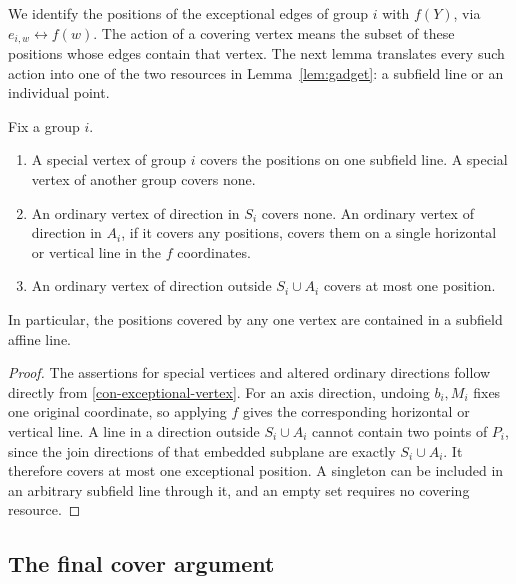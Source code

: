 We identify the positions of the exceptional edges of group \(i\)
with \(f(Y)\), via \(e_{i,w}\leftrightarrow f(w)\).  The action
of a covering vertex means the subset of these positions whose edges
contain that vertex.  The next lemma translates every such action
into one of the two resources in Lemma~\ref{lem:gadget}: a subfield
line or an individual point.

\begin{lemma}
\label{con-label-action}
Fix a group \(i\).
\begin{enumerate}
\item A special vertex of group \(i\) covers the positions on one
subfield line.  A special vertex of another group covers none.
\item An ordinary vertex of direction in \(S_i\) covers none.
An ordinary vertex of direction in \(A_i\), if it covers any
positions, covers them on a single horizontal or vertical line in
the \(f\) coordinates.
\item An ordinary vertex of direction outside \(S_i\cup A_i\)
covers at most one position.
\end{enumerate}
In particular, the positions covered by any one vertex are contained
in a subfield affine line.
\end{lemma}

\begin{proof}
The assertions for special vertices and altered ordinary directions
follow directly from \eqref{con-exceptional-vertex}.  For an axis
direction, undoing \(b_i,M_i\) fixes one original coordinate, so
applying \(f\) gives the corresponding horizontal or vertical
line.  A line in a direction outside \(S_i\cup A_i\) cannot
contain two points of \(P_i\), since the join directions of that
embedded subplane are exactly \(S_i\cup A_i\).  It therefore
covers at most one exceptional position.  A singleton can be
included in an arbitrary subfield line through it, and an empty
set requires no covering resource.
\end{proof}

\subsection{The final cover argument}

